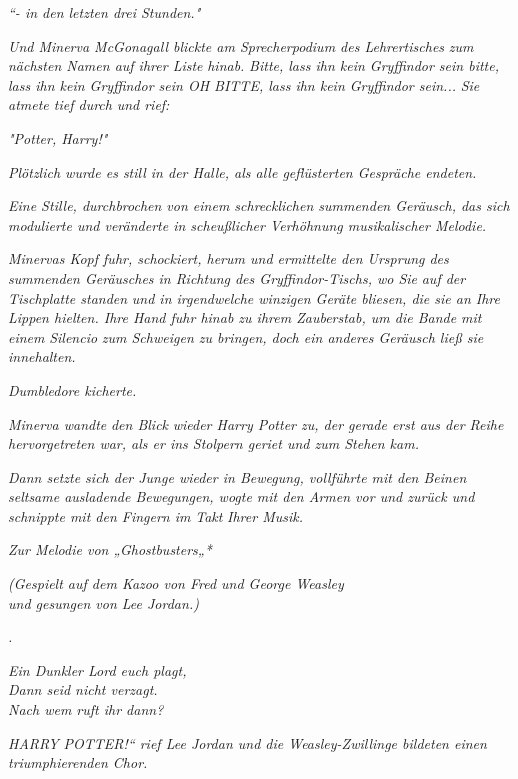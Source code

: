 {\emph{\emph{“- in den letzten drei Stunden."}}

\emph{Und Minerva McGonagall blickte am Sprecherpodium des Lehrertisches} \emph{zum} \emph{nächsten Namen auf ihrer Liste} \emph{hinab.} \emph{\emph{Bitte, lass ihn kein Gryffindor sein bitte, lass ihn kein Gryffindor sein OH BITTE, lass ihn kein Gryffindor sein...}} \emph{Sie} \emph{atmete tief durch} \emph{und rief:}

\emph{"Potter, Harry!"}

\emph{Plötzlich wurde es still in der Halle, als alle geflüsterten Gespräche endeten.}

\emph{Eine Stille, durchbrochen von einem schrecklichen summenden Geräusch, das sich modulierte und veränderte in scheußlicher Verhöhnung musikalischer Melodie.}

\emph{Minervas Kopf fuhr, schockiert, herum und ermittelte den Ursprung des summenden Geräusches in Richtung des Gryffindor-Tischs, wo Sie} \emph{\emph{auf der Tischplatte standen}} \emph{und in irgendwelche winzigen Geräte bliesen, die sie an Ihre Lippen hielten. Ihre Hand fuhr hinab zu ihrem Zauberstab, um die Bande mit einem} \emph{\emph{Silencio}} \emph{zum Schweigen zu bringen, doch ein anderes Geräusch ließ sie innehalten.}

\emph{Dumbledore kicherte.}

\emph{Minerva wandte} \emph{den Blick} \emph{wieder Harry Potter zu, der gerade erst aus der Reihe hervorgetreten war, als er ins Stolpern geriet und zum Stehen kam.}

\emph{Dann setzte sich der Junge wieder in Bewegung, vollführte mit den Beinen seltsame ausladende Bewegungen, wogte mit den Armen vor und zurück und schnippte mit den Fingern im} \emph{Takt} \emph{Ihrer Musik.}

\emph{Zur Melodie von „Ghostbusters„*}

\hfill\break

\emph{(Gespielt auf dem Kazoo von Fred und George Weasley\\ und gesungen von Lee Jordan.)}

\hfill\break

\emph{.}

\hfill\break

\emph{Ein Dunkler Lord euch plagt,\\ Dann seid nicht verzagt.\\ Nach wem ruft ihr dann?}

\hfill\break \emph{HARRY POTTER!“ rief Lee Jordan und die Weasley-Zwillinge bildeten einen triumphierenden Chor.}

}
